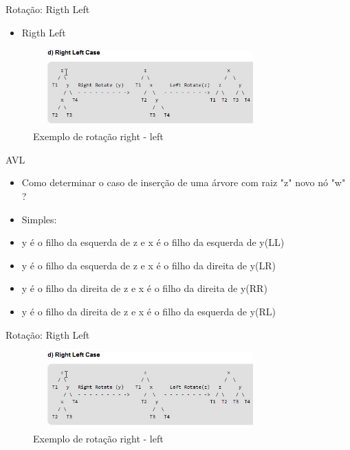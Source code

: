 \begin{frame}
	\begin{block}{Rotação: Rigth Left}
		\begin{itemize}
			\item Rigth Left
		\end{itemize}
		\begin{figure}[!htb]
			\centering	  				
			\includegraphics[height=3cm, width = 9cm]{./pic/rigthLeft.jpg}
			\caption{Exemplo de rotação right - left}
			\label{fig_pilha}
		\end{figure}
	\end{block}
\end{frame}

\begin{frame}
	\begin{block}{AVL}
		\begin{itemize}
			\item Como determinar o caso de inserção de uma árvore com raiz "z" novo nó "w" ?
			
			\item Simples:
			
			\item y é o filho da esquerda de z e x é o filho da esquerda de y(LL)
			\item y é o filho da esquerda de z e x é o filho da direita de y(LR)
			\item y é o filho da direita de z e x é o filho da direita de y(RR)
			\item y é o filho da direita de z e x é o filho da esquerda de y(RL)
		\end{itemize}
	\end{block}
\end{frame}


\begin{frame}
	\begin{block}{Rotação: Rigth Left}
		\begin{figure}[!htb]
			\centering	  				
			\includegraphics[height=3cm, width = 9cm]{./pic/rigthLeft.jpg}
			\caption{Exemplo de rotação right - left}
			\label{fig_pilha}
		\end{figure}
	\end{block}
\end{frame}


